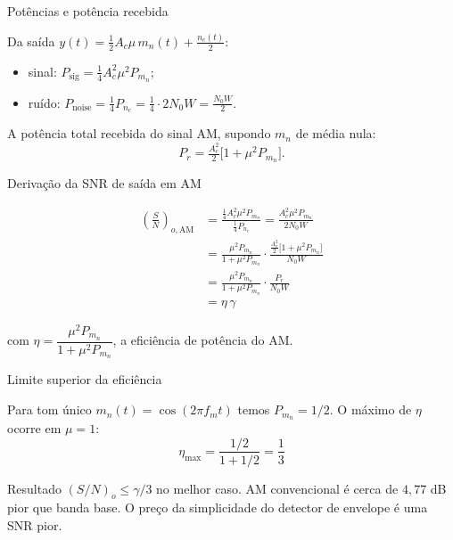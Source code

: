 \begin{frame}{Potências e potência recebida}

Da saída $y(t) = \tfrac{1}{2} A_c \mu\, m_n(t) + \tfrac{n_c(t)}{2}$:
\begin{itemize}
\item sinal: $P_{\text{sig}} = \tfrac{1}{4} A_c^2 \mu^2 P_{m_n}$;
\item ruído: $P_{\text{noise}} = \tfrac{1}{4} P_{n_c} = \tfrac{1}{4}\cdot 2 N_0 W = \tfrac{N_0 W}{2}$.
\end{itemize}

\vspace{0.2cm}

A potência total recebida do sinal AM, supondo $m_n$ de média nula:
\[
P_r = \tfrac{A_c^2}{2}\bigl[1 + \mu^2 P_{m_n}\bigr].
\]

\end{frame}


\begin{frame}{Derivação da SNR de saída em AM}

\begin{align*}
\left(\frac{S}{N}\right)_{o,\text{AM}}
&= \frac{\tfrac{1}{4} A_c^2 \mu^2 P_{m_n}}{\tfrac{1}{4} P_{n_c}}
 = \frac{A_c^2 \mu^2 P_{m_n}}{2 N_0 W} \\[3pt]
&= \frac{\mu^2 P_{m_n}}{1+\mu^2 P_{m_n}} \cdot \frac{\tfrac{A_c^2}{2}\bigl[1+\mu^2 P_{m_n}\bigr]}{N_0 W} \\[3pt]
&= \frac{\mu^2 P_{m_n}}{1+\mu^2 P_{m_n}} \cdot \frac{P_r}{N_0 W} \\[3pt]
&= \eta\,\gamma
\end{align*}

com $\eta = \dfrac{\mu^2 P_{m_n}}{1+\mu^2 P_{m_n}}$, a eficiência de potência do AM.

\end{frame}


\begin{frame}{Limite superior da eficiência}

Para tom único $m_n(t) = \cos(2\pi f_m t)$ temos $P_{m_n} = 1/2$. O máximo de $\eta$ ocorre em $\mu = 1$:
\[
\eta_{\max} = \frac{1/2}{1 + 1/2} = \frac{1}{3}
\]

\begin{block}{Resultado}
$(S/N)_o \le \gamma/3$ no melhor caso. AM convencional é cerca de $4{,}77$ dB pior que banda base. O preço da simplicidade do detector de envelope é uma SNR pior.
\end{block}

\end{frame}

